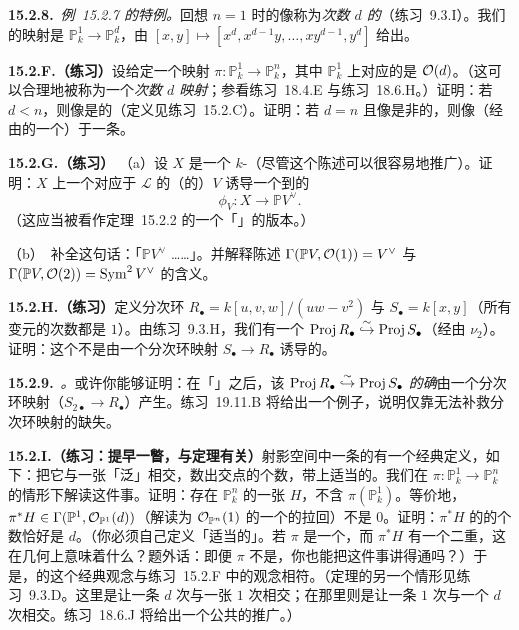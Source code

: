 \textbf{15.2.8.}\ \emph{\mbox{例~15.2.7} 的特例。}\quad 回想 $n=1$ 时\trVeroneseEmbedding{}的像称为\emph{次数 $d$ 的\trRationalNormalCurve}（\mbox{练习~9.3.I}）。我们的映射是 $\mathbb{P}^1_k\to\mathbb{P}^d_k$，由 $[x,y]\mapsto[x^d,x^{d-1}y,\dots,xy^{d-1},y^d]$ 给出。

\textbf{15.2.F.（练习）}\quad 设给定一个映射 $\pi\colon\mathbb{P}^1_k\to\mathbb{P}^n_k$，其中 $\mathbb{P}^1_k$ 上对应的\trInvertibleSheaf{}是 $\mathcal{O}(d)$。（这可以合理地被称为一个\emph{次数 $d$ 映射}；参看\mbox{练习~18.4.E} 与\mbox{练习~18.6.H}。）证明：若 $d<n$，则像是\trDegenerate{}的（定义见\mbox{练习~15.2.C}）。证明：若 $d=n$ 且像是非\trDegenerate{}的，则像（经由\trProjectiveSpace{}的一个\trAutomorphism）\trIsomorphic{}于一条\trRationalNormalCurve。

\textbf{15.2.G.（练习）}\quad
（a）设 $X$ 是一个 $k$-\trScheme（尽管这个陈述可以很容易地推广）。证明：$X$ 上一个对应于 $\mathscr{L}$ 的（\trFiniteDimensional{}的）\trBasePointFree\trLinearSystem $V$ 诱导一个到\trProjectiveSpace{}的\trMorphism
\[
\phi_V\colon X\longrightarrow\mathbb{P}V^\vee.
\]
（这应当被看作\mbox{定理~15.2.2} 的一个「\trCoordinateFree」的版本。）

（b）\hard\ 补全这句话：「$\mathbb{P}V^\vee$ \trRepresentation{}\trFunctor{}……」。并解释陈述 $\Gamma(\mathbb{P}V,\mathcal{O}(1))=V^\vee$ 与 $\Gamma(\mathbb{P}V,\mathcal{O}(2))=\operatorname{Sym}^2V^\vee$ 的含义。

\textbf{15.2.H.（练习）}\quad 定义分次环 $R_\bullet=k[u,v,w]/(uw-v^2)$ 与 $S_\bullet=k[x,y]$（所有变元的次数都是 $1$）。由\mbox{练习~9.3.H}，我们有一个\trIsomorphism{} $\operatorname{Proj} R_\bullet\overset{\sim}{\hookrightarrow}\operatorname{Proj} S_\bullet$（经由\trVeroneseEmbedding{} $\nu_2$）。证明：这个\trIsomorphism{}不是由一个分次环映射 $S_\bullet\to R_\bullet$ 诱导的。

\textbf{15.2.9.}\ \emph{\trhRemark{}。}\quad 或许你能够证明：在「\trRegrading」之后，该\trIsomorphism{} $\operatorname{Proj} R_\bullet\overset{\sim}{\hookrightarrow}\operatorname{Proj} S_\bullet$ \emph{的确}由一个分次环映射（$S_{2\bullet}\to R_\bullet$）产生。\mbox{练习~19.11.B} 将给出一个例子，说明仅靠\trRegrading{}无法补救分次环映射的缺失。

\textbf{15.2.I.（练习：提早一瞥\trIntersectionTheory，与\trBezout{}定理有关）}\quad 射影空间中一条\trCurve{}的\trDegree{}有一个经典定义，如下：把它与一张「泛」\trHyperplane{}相交，数出交点的个数，带上适当的\trMultiplicity。我们在 $\pi\colon\mathbb{P}^1_k\to\mathbb{P}^n_k$ 的情形下解读这件事。证明：存在 $\mathbb{P}^n_k$ 的一张\trHyperplane{} $H$，不含 $\pi(\mathbb{P}^1_k)$。等价地，$\pi^*H\in\Gamma(\mathbb{P}^1,\mathcal{O}_{\mathbb{P}^1}(d))$（解读为 $\mathcal{O}_{\mathbb{P}^n}(1)$ 的一个\trSection{}的拉回）不是 $0$。证明：$\pi^*H$ 的\trZeros{}的个数恰好是 $d$。（你必须自己定义「适当的\trMultiplicity」。若 $\pi$ 是一个\trClosedEmbedding{}，而 $\pi^*H$ 有一个二重\trZeros，这在几何上意味着什么？题外话：即便 $\pi$ 不是\trClosedEmbedding，你也能把这件事讲得通吗？）于是，\trDegree{}的这个经典观念与\mbox{练习~15.2.F} 中的\trDegree{}观念相符。（\trBezout{}定理的另一个情形见\mbox{练习~9.3.D}。这里是让一条 $d$ 次\trCurve{}与一张 $1$ 次\trHyperplane{}相交；在那里则是让一条 $1$ 次\trCurve{}与一个 $d$ 次\trHypersurface{}相交。\mbox{练习~18.6.J} 将给出一个公共的推广。）

